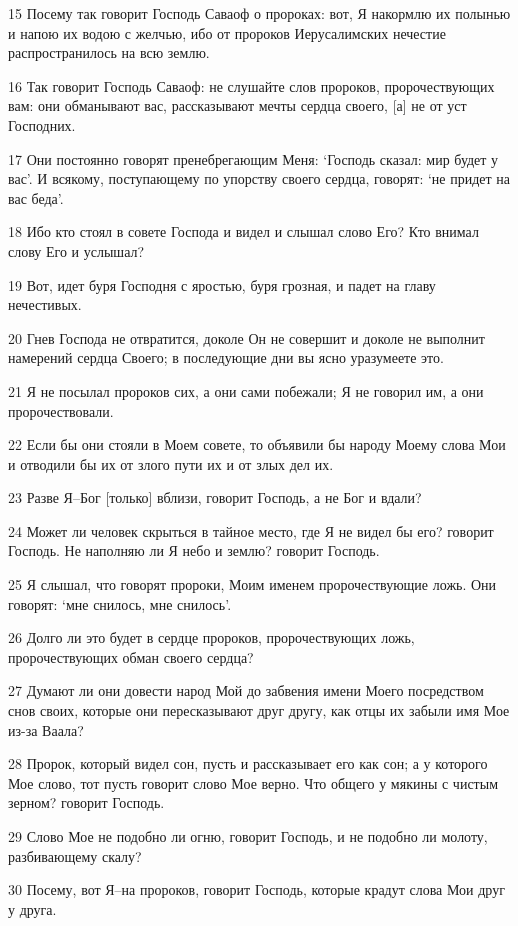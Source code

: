 \par 15 Посему так говорит Господь Саваоф о пророках: вот, Я накормлю их полынью и напою их водою с желчью, ибо от пророков Иерусалимских нечестие распространилось на всю землю.
\par 16 Так говорит Господь Саваоф: не слушайте слов пророков, пророчествующих вам: они обманывают вас, рассказывают мечты сердца своего, [а] не от уст Господних.
\par 17 Они постоянно говорят пренебрегающим Меня: `Господь сказал: мир будет у вас'. И всякому, поступающему по упорству своего сердца, говорят: `не придет на вас беда'.
\par 18 Ибо кто стоял в совете Господа и видел и слышал слово Его? Кто внимал слову Его и услышал?
\par 19 Вот, идет буря Господня с яростью, буря грозная, и падет на главу нечестивых.
\par 20 Гнев Господа не отвратится, доколе Он не совершит и доколе не выполнит намерений сердца Своего; в последующие дни вы ясно уразумеете это.
\par 21 Я не посылал пророков сих, а они сами побежали; Я не говорил им, а они пророчествовали.
\par 22 Если бы они стояли в Моем совете, то объявили бы народу Моему слова Мои и отводили бы их от злого пути их и от злых дел их.
\par 23 Разве Я--Бог [только] вблизи, говорит Господь, а не Бог и вдали?
\par 24 Может ли человек скрыться в тайное место, где Я не видел бы его? говорит Господь. Не наполняю ли Я небо и землю? говорит Господь.
\par 25 Я слышал, что говорят пророки, Моим именем пророчествующие ложь. Они говорят: `мне снилось, мне снилось'.
\par 26 Долго ли это будет в сердце пророков, пророчествующих ложь, пророчествующих обман своего сердца?
\par 27 Думают ли они довести народ Мой до забвения имени Моего посредством снов своих, которые они пересказывают друг другу, как отцы их забыли имя Мое из-за Ваала?
\par 28 Пророк, который видел сон, пусть и рассказывает его как сон; а у которого Мое слово, тот пусть говорит слово Мое верно. Что общего у мякины с чистым зерном? говорит Господь.
\par 29 Слово Мое не подобно ли огню, говорит Господь, и не подобно ли молоту, разбивающему скалу?
\par 30 Посему, вот Я--на пророков, говорит Господь, которые крадут слова Мои друг у друга.
